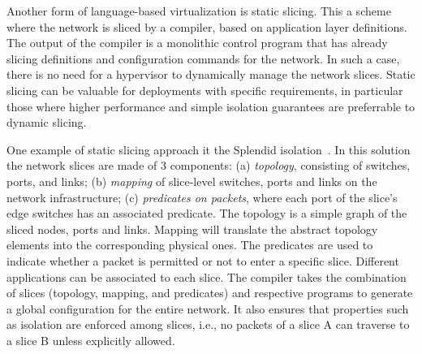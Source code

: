 
Another form of language-based virtualization is static slicing. 
This a scheme where the network is sliced by a compiler, based on application layer definitions.
The output of the compiler is a monolithic control program that has already slicing definitions and configuration commands for the network.
In such a case, there is no need for a hypervisor to dynamically manage the network slices.
Static slicing can be valuable for deployments with specific requirements, in particular those where higher performance and simple isolation guarantees are preferrable to
dynamic slicing.

One example of static slicing approach it the Splendid isolation~\cite{gutz2012}.
In this solution the network slices are made of 3 components:
(a) \textit{topology}, consisting of switches, ports, and links;
(b) \textit{mapping} of slice-level switches, ports and links on the network infrastructure;
(c) \textit{predicates on packets}, where each port of the slice's edge switches has an associated predicate.
The topology is a simple graph of the sliced nodes, ports and links.
Mapping will translate the abstract topology elements into the corresponding physical ones.
The predicates are used to indicate whether a packet is permitted or not to enter a specific slice. 
Different applications can be associated to each slice.
The compiler takes the combination of slices (topology, mapping, and predicates) and respective programs to generate a global configuration for the entire network. 
It also ensures that properties such as isolation are enforced among slices, i.e., no packets of a slice A can traverse to a slice B unless 
explicitly allowed.

